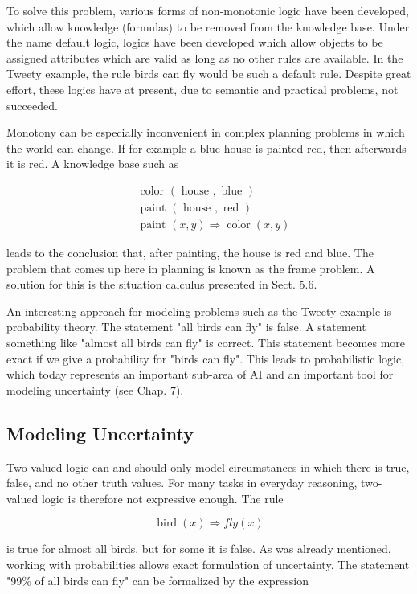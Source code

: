 \documentclass[10pt]{article}
\begin{document}
To solve this problem, various forms of non-monotonic logic have been developed, which allow knowledge (formulas) to be removed from the knowledge base. Under the name default logic, logics have been developed which allow objects to be assigned attributes which are valid as long as no other rules are available. In the Tweety example, the rule birds can fly would be such a default rule. Despite great effort, these logics have at present, due to semantic and practical problems, not succeeded.

Monotony can be especially inconvenient in complex planning problems in which the world can change. If for example a blue house is painted red, then afterwards it is red. A knowledge base such as

$$
\begin{aligned}
& \text { color }(\text { house }, \text { blue }) \\
& \text { paint }(\text { house }, \text { red }) \\
& \text { paint }(x, y) \Rightarrow \operatorname{color}(x, y)
\end{aligned}
$$

leads to the conclusion that, after painting, the house is red and blue. The problem that comes up here in planning is known as the frame problem. A solution for this is the situation calculus presented in Sect. 5.6.

An interesting approach for modeling problems such as the Tweety example is probability theory. The statement "all birds can fly" is false. A statement something like "almost all birds can fly" is correct. This statement becomes more exact if we give a probability for "birds can fly". This leads to probabilistic logic, which today represents an important sub-area of AI and an important tool for modeling uncertainty (see Chap. 7).

\subsection*{Modeling Uncertainty}
Two-valued logic can and should only model circumstances in which there is true, false, and no other truth values. For many tasks in everyday reasoning, two-valued logic is therefore not expressive enough. The rule

$$
\operatorname{bird}(x) \Rightarrow f l y(x)
$$

is true for almost all birds, but for some it is false. As was already mentioned, working with probabilities allows exact formulation of uncertainty. The statement "99\% of all birds can fly" can be formalized by the expression
\end{document}
